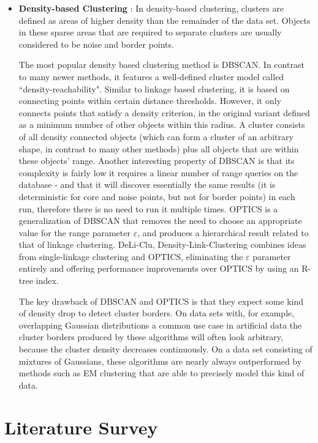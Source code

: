 \begin{itemize}
\item \textbf{Density-based Clustering} : In density-based clustering, clusters are defined as areas of higher density
than the remainder of the data set. Objects in these sparse areas that are required to separate clusters are usually
considered to be noise and border points.

The most popular density based clustering method is DBSCAN. In contrast to many newer methods, it features a well-defined
cluster model called ``density-reachability". Similar to linkage based clustering, it is based on connecting points within
certain distance thresholds. However, it only connects points that satisfy a density criterion, in the original variant
defined as a minimum number of other objects within this radius. A cluster consists of all density connected objects
(which can form a cluster of an arbitrary shape, in contrast to many other methods) plus all objects that are within
these objects' range. Another interesting property of DBSCAN is that its complexity is fairly low it requires a linear
number of range queries on the database - and that it will discover essentially the same results (it is deterministic
for core and noise points, but not for border points) in each run, therefore there is no need to run it multiple times.
OPTICS is a generalization of DBSCAN that removes the need to choose an appropriate value for the range parameter ${\varepsilon}$,
and produces a hierarchical result related to that of linkage clustering. DeLi-Clu, Density-Link-Clustering combines ideas
from single-linkage clustering and OPTICS, eliminating the ${\varepsilon}$ parameter entirely and offering performance improvements
over OPTICS by using an R-tree index.

The key drawback of DBSCAN and OPTICS is that they expect some kind of density drop to detect cluster borders.
On data sets with, for example, overlapping Gaussian distributions a common use case in artificial data the
cluster borders produced by these algorithms will often look arbitrary, because the cluster density decreases
continuously. On a data set consisting of mixtures of Gaussians, these algorithms are nearly always outperformed
by methods such as EM clustering that are able to precisely model this kind of data.
\end{itemize}

\section{Literature Survey}

